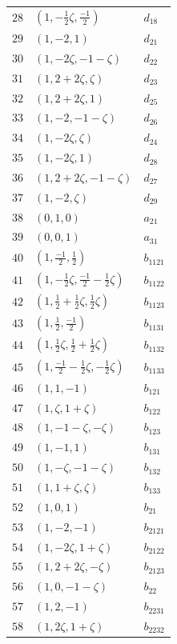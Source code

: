 \documentclass[aps,pra,reprint,superscriptaddress,longbibliography,nofootinbib,floatfix,10pt]{revtex4-2}
\theoremstyle{definition}
\begin{document}
\begin{longtable}{rll}
$28$ & $(1,-\frac{1}{2}\zeta,\frac{-1}{2})$ & $d_{18}$\\
$29$ & $(1,-2,1)$ & $d_{21}$\\
$30$ & $(1,-2\zeta,-1-\zeta)$ & $d_{22}$\\
$31$ & $(1,2+2\zeta,\zeta)$ & $d_{23}$\\
$32$ & $(1,2+2\zeta,1)$ & $d_{25}$\\
$33$ & $(1,-2,-1-\zeta)$ & $d_{26}$\\
$34$ & $(1,-2\zeta,\zeta)$ & $d_{24}$\\
$35$ & $(1,-2\zeta,1)$ & $d_{28}$\\
$36$ & $(1,2+2\zeta,-1-\zeta)$ & $d_{27}$\\
$37$ & $(1,-2,\zeta)$ & $d_{29}$\\
$38$ & $(0,1,0)$ & $a_{21}$\\
$39$ & $(0,0,1)$ & $a_{31}$\\
$40$ & $(1,\frac{-1}{2},\frac{1}{2})$ & $b_{1121}$\\
$41$ & $(1,-\frac{1}{2}\zeta,\frac{-1}{2}-\frac{1}{2}\zeta)$ & $b_{1122}$\\
$42$ & $(1,\frac{1}{2}+\frac{1}{2}\zeta,\frac{1}{2}\zeta)$ & $b_{1123}$\\
$43$ & $(1,\frac{1}{2},\frac{-1}{2})$ & $b_{1131}$\\
$44$ & $(1,\frac{1}{2}\zeta,\frac{1}{2}+\frac{1}{2}\zeta)$ & $b_{1132}$\\
$45$ & $(1,\frac{-1}{2}-\frac{1}{2}\zeta,-\frac{1}{2}\zeta)$ & $b_{1133}$\\
$46$ & $(1,1,-1)$ & $b_{121}$\\
$47$ & $(1,\zeta,1+\zeta)$ & $b_{122}$\\
$48$ & $(1,-1-\zeta,-\zeta)$ & $b_{123}$\\
$49$ & $(1,-1,1)$ & $b_{131}$\\
$50$ & $(1,-\zeta,-1-\zeta)$ & $b_{132}$\\
$51$ & $(1,1+\zeta,\zeta)$ & $b_{133}$\\
$52$ & $(1,0,1)$ & $b_{21}$\\
$53$ & $(1,-2,-1)$ & $b_{2121}$\\
$54$ & $(1,-2\zeta,1+\zeta)$ & $b_{2122}$\\
$55$ & $(1,2+2\zeta,-\zeta)$ & $b_{2123}$\\
$56$ & $(1,0,-1-\zeta)$ & $b_{22}$\\
$57$ & $(1,2,-1)$ & $b_{2231}$\\
$58$ & $(1,2\zeta,1+\zeta)$ & $b_{2232}$\\

\end{longtable}
\end{document}
